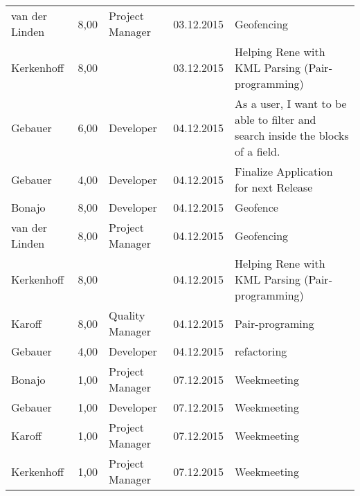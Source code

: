\begin{longtable}{ l r p{2cm} c p{4cm} }
		van der Linden          & 8,00           & Project Manager       & 03.12.2015    & Geofencing                                                                      \\
		Kerkenhoff              & 8,00           &                       & 03.12.2015    & Helping Rene with KML Parsing (Pair-programming)                                 \\
		Gebauer                 & 6,00           & Developer             & 04.12.2015    & As a user, I want to be able to filter and search inside the blocks of a field. \\
		Gebauer                 & 4,00           & Developer             & 04.12.2015    & Finalize Application for next Release                                           \\
		Bonajo                  & 8,00           & Developer             & 04.12.2015    & Geofence                                                                        \\
		van der Linden          & 8,00           & Project Manager       & 04.12.2015    & Geofencing                                                                      \\
		Kerkenhoff              & 8,00           &                       & 04.12.2015    & Helping Rene with KML Parsing (Pair-programming)                                 \\
		Karoff                  & 8,00           & Quality Manager       & 04.12.2015    & Pair-programing                                                                  \\
		Gebauer                 & 4,00           & Developer             & 04.12.2015    & refactoring                                                                     \\
		Bonajo                  & 1,00           & Project Manager       & 07.12.2015    & Weekmeeting                                                                     \\
		Gebauer                 & 1,00           & Developer             & 07.12.2015    & Weekmeeting                                                                     \\
		Karoff                  & 1,00           & Project Manager       & 07.12.2015    & Weekmeeting                                                                    \\
		Kerkenhoff              & 1,00           & Project Manager & 07.12.2015    & Weekmeeting                                                                     \\

\end{longtable}
